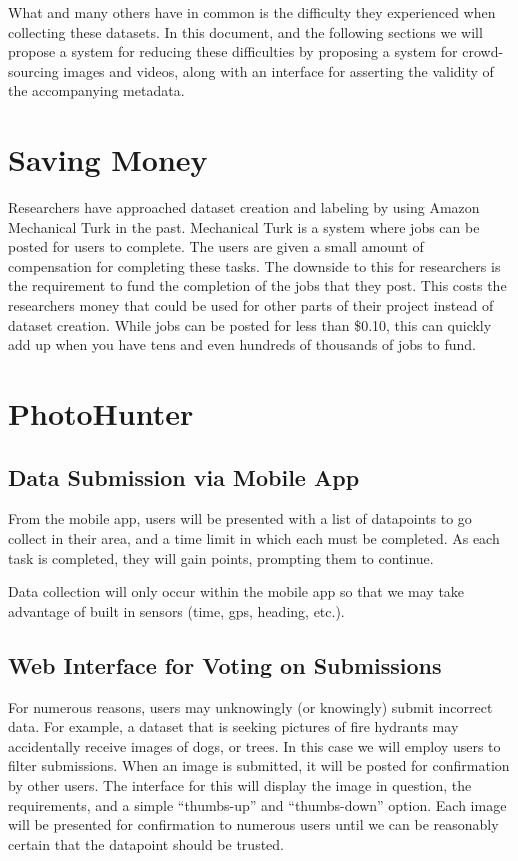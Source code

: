 \documentclass{article}
\begin{document}
What \cite{islam2014geofaces} and many others have in common
is the difficulty they experienced when collecting these datasets. In
this document, and the following sections we will propose a system for
reducing these difficulties by proposing a system for crowd-sourcing
images and videos, along with an interface for asserting the validity
of the accompanying metadata.

\section{Saving Money}

Researchers have approached dataset creation and labeling by using 
Amazon Mechanical Turk in the past.  Mechanical Turk is a system where
jobs can be posted for users to complete.  The users are given a small 
amount of compensation for completing these tasks.  The downside to this
for researchers is the requirement to fund the completion of the jobs
that they post.  This costs the researchers money that could be used
for other parts of their project instead of dataset creation.  While jobs
can be posted for less than \$0.10, this can quickly add up when you have
tens and even hundreds of thousands of jobs to fund.

\section{PhotoHunter}

\subsection{Data Submission via Mobile App}

From the mobile app, users will be presented with a list of datapoints
to go collect in their area, and a time limit in which each must be
completed. As each task is completed, they will gain points, prompting
them to continue.

Data collection will only occur within the mobile app so that we may
take advantage of built in sensors (time, gps, heading, etc.).

\subsection{Web Interface for Voting on Submissions}

For numerous reasons, users may unknowingly (or knowingly) submit
incorrect data. For example, a dataset that is seeking pictures of
fire hydrants may accidentally receive images of dogs, or trees. In
this case we will employ users to filter submissions. When an image is
submitted, it will be posted for confirmation by other users. The
interface for this will display the image in question, the
requirements, and a simple ``thumbs-up'' and ``thumbs-down'' option.
Each image will be presented for confirmation to numerous users until
we can be reasonably certain that the datapoint should be trusted.
\end{document}
